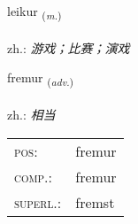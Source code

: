 \documentclass[frontgrid, backgrid]{flacards}\usepackage[]{graphicx}\usepackage[]{xcolor}
\begin{document}
\renewcommand{\blhead}{\vskip5pt {\small\bfseries\footnotesize Nafnorð | 名词 }}
\renewcommand{\bcfoot}{\vskip5pt \hspace{2pt}{\small\bfseries\footnotesize 1K}}


{leikur \small{\textsubscript{(\textit{m.})}} \\[1ex] %
\textphonetic{[leiːkʏr]} \\
zh.: \emph{游戏；比赛；演戏} \\  [2ex]
\renewcommand*{\arraystretch}{0.8}
}

\renewcommand{\flhead}{\vskip5pt \fboxsep=0pt {\small\bfseries\footnotesize Atviksorð | 副词}}
\renewcommand{\fcfoot}{\vskip5pt \fboxsep=0pt \hspace{2pt}{\small\bfseries\footnotesize 1K}}

\renewcommand{\blhead}{\vskip5pt {\small\bfseries\footnotesize Atviksorð | 副词 }}
\renewcommand{\bcfoot}{\vskip5pt \hspace{2pt}{\small\bfseries\footnotesize 1K}}


{fremur \small{\textsubscript{(\textit{adv.})}} \\[1ex] %
\textphonetic{[frɛːmʏr]} \\
zh.: \emph{相当} \\  [2ex]
\renewcommand*{\arraystretch}{0.8}
\begin{tabular}{ll}
\textsc{pos}: & fremur \\ 
\textsc{comp.}: & fremur \\ 
\textsc{superl.}: & fremst \\
\end{tabular}
}

\renewcommand{\flhead}{\vskip5pt \fboxsep=0pt {\small\bfseries\footnotesize Nafnorð | 名词}}
\renewcommand{\fcfoot}{\vskip5pt \fboxsep=0pt \hspace{2pt}{\small\bfseries\footnotesize 1K}}
\end{document}
